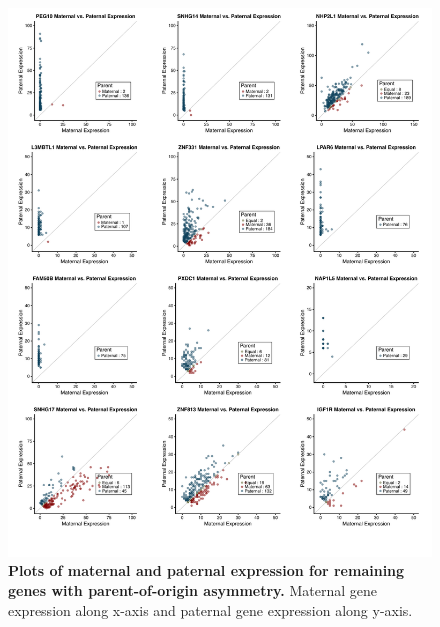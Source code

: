 \begin{figure}[!htb]
\centering \includegraphics[width=5in]{img/ch03/fig-s1.pdf}
\caption[Plots of maternal and paternal expression for remaining genes with parent-of-origin asymmetry.]{\textbf{Plots of maternal and paternal expression for remaining genes with parent-of-origin asymmetry.} Maternal gene expression along x-axis and paternal gene expression along y-axis.}
\label{fig:matpatgexp}
\end{figure}





